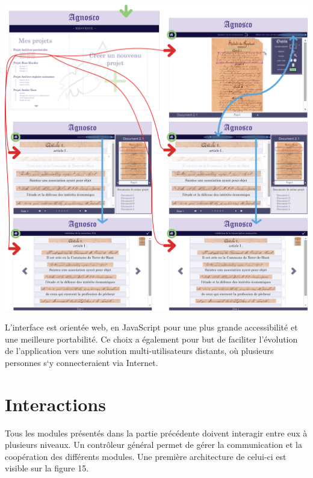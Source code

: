\paragraph{}
\begin{mdframed}[frametitle={Figure 15 : Hiérarchie entre les pages}, innerbottommargin=10]
\begin{center}
\includegraphics[scale=0.6]{ihm6.png}
\end{center}
\end{mdframed}

L’interface est orientée web, en JavaScript pour une plus grande accessibilité 
et une meilleure portabilité. Ce choix a également pour but de faciliter 
l’évolution de l’application vers une solution multi-utilisateurs distants, 
où plusieurs personnes s‘y connecteraient via Internet.

\newpage

\section{Interactions}

Tous les modules présentés dans la partie précédente doivent interagir entre
eux à plusieurs niveaux. Un contrôleur général permet de gérer la communication
et la coopération des différents modules. Une première architecture de celui-ci
est visible sur la figure 15.

